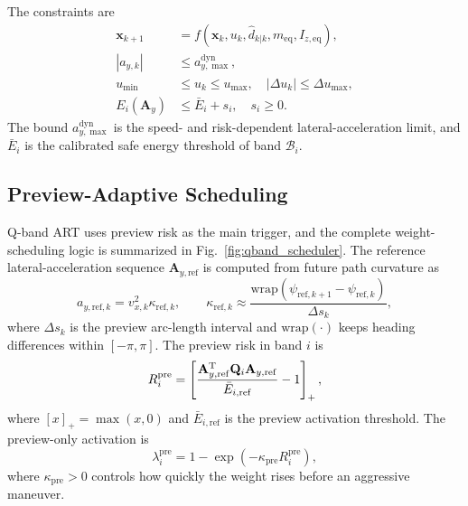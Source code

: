 The constraints are
\begin{equation}
\begin{aligned}
    \mathbf{x}_{k+1}&=f(\mathbf{x}_k,u_k,\hat d_{k|k},m_{\mathrm{eq}},I_{z,\mathrm{eq}}),\\
    |a_{y,k}|&\leq a_{y,\max}^{\mathrm{dyn}},\\
    u_{\min}&\leq u_k\leq u_{\max},\quad |\Delta u_k|\leq \Delta u_{\max},\\
    E_i(\mathbf{A}_y)&\leq \bar{E}_i+s_i,\quad s_i\geq0 .
\end{aligned}
\label{eq:qband_constraints}
\end{equation}
The bound $a_{y,\max}^{\mathrm{dyn}}$ is the speed- and risk-dependent lateral-acceleration limit, and $\bar E_i$ is the calibrated safe energy threshold of band $\mathcal{B}_i$.

\subsection{Preview-Adaptive Scheduling}
Q-band ART uses preview risk as the main trigger, and the complete weight-scheduling logic is summarized in Fig.~\ref{fig:qband_scheduler}. The reference lateral-acceleration sequence $\mathbf{A}_{y,\mathrm{ref}}$ is computed from future path curvature as
\begin{equation}
    a_{y,\mathrm{ref},k}=v_{x,k}^2\kappa_{\mathrm{ref},k},
    \qquad
    \kappa_{\mathrm{ref},k}\approx
    \frac{\mathrm{wrap}(\psi_{\mathrm{ref},k+1}-\psi_{\mathrm{ref},k})}{\Delta s_k},
\end{equation}
where $\Delta s_k$ is the preview arc-length interval and $\mathrm{wrap}(\cdot)$ keeps heading differences within $[-\pi,\pi]$. The preview risk in band $i$ is
\begin{equation}
    R_i^{\mathrm{pre}}=\left[
    \frac{\mathbf{A}_{y,\mathrm{ref}}^{\mathrm{T}}\mathbf{Q}_i\mathbf{A}_{y,\mathrm{ref}}}
    {\bar{E}_{i,\mathrm{ref}}}-1\right]_+ ,
    \label{eq:preview_risk}
\end{equation}
where $[x]_+=\max(x,0)$ and $\bar{E}_{i,\mathrm{ref}}$ is the preview activation threshold. The preview-only activation is
\begin{equation}
    \lambda_i^{\mathrm{pre}}=1-\exp(-\kappa_{\mathrm{pre}}R_i^{\mathrm{pre}}),
\end{equation}
where $\kappa_{\mathrm{pre}}>0$ controls how quickly the weight rises before an aggressive maneuver.


